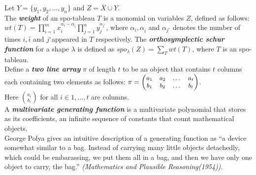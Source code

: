 \documentclass[25pt, a0paper]{tikzposter}
\newcommand{\ds}{\displaystyle}
\renewcommand{\textit}[1]{\emph{\textbf{#1}}}
\begin{document}
{\begin{multicols*}{3}
		Let $Y = \{y_1, y_2, \ldots, y_n\} $ and $Z = \overline{X} \cup Y $.\\
		The \textit{weight} of an spo-tableau $T$ is a monomial on variables $Z$, defined as follows:
		$wt(T) = \prod_{i=1}^{m}x_i^{\alpha_i - \alpha_{\overline{i}}} \prod_{j=1}^{n}y_j^{\alpha_{j^\circ}}$,
		where $\alpha_i, \alpha_{\overline{i}}$ and $\alpha_{j^\circ} $ denotes the number of times $i, \overline{i} $ and $j^\circ $appeared in $T$ respectively.
		\vfill
		\columnbreak
		The \textit{orthosymplectic schur function} for a shape $\lambda$ is defined as $spo_\lambda(Z) = \sum_{T} wt(T) $, where $T$ is an spo-tableau.\\
		Define a \textit{two line array} $\pi$ of length $t$ to be an object that contains $t$ columns each containing two elements as follows:
		$\small\pi = 
			\begin{pmatrix}
				a_1 & a_2  & \dots & a_t\\
				b_1 & b_2 & \dots & b_t
			\end{pmatrix}
		$.\\
		Here $\ds \binom{a_i}{b_i}$ for all $i \in {1, \dots, t}$ are columns.
		\\A \textit{multivariate generating function} is a multivariate polynomial that stores as its coefficients, an infinite sequence of constants that count mathematical objects.
		\\George Polya gives an intuitive description of a generating function as ``a device somewhat similar to a bag. Instead of carrying many little objects detachedly, which could be embarassing, we put them all in a bag, and then we have only one object to carry, the bag.'' \emph{(Mathematics and Plausible Reasoning(1954))}.
  	\end{multicols*}
}
\end{document}
